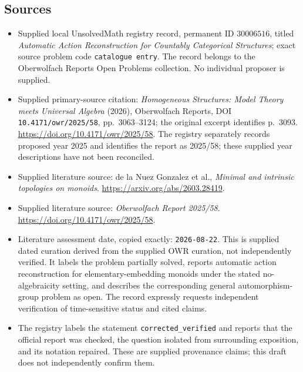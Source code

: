 \documentclass[11pt]{article}
\begin{document}
\subsection{Sources}
\begin{itemize}
\item Supplied local UnsolvedMath registry record, permanent ID \(30006516\), titled \emph{Automatic Action Reconstruction for Countably Categorical Structures}; exact source problem code \texttt{catalogue entry}. The record belongs to the Oberwolfach Reports Open Problems collection. No individual proposer is supplied.
\item Supplied primary-source citation: \emph{Homogeneous Structures: Model Theory meets Universal Algebra} (2026), Oberwolfach Reports, DOI \texttt{10.4171/owr/2025/58}, pp.\ 3063--3124; the original excerpt identifies p.\ 3093. \url{https://doi.org/10.4171/owr/2025/58}. The registry separately records proposed year 2025 and identifies the report as 2025/58; these supplied year descriptions have not been reconciled.
\item Supplied literature source: de la Nuez Gonzalez et al., \emph{Minimal and intrinsic topologies on monoids}. \url{https://arxiv.org/abs/2603.28419}.
\item Supplied literature source: \emph{Oberwolfach Report 2025/58}. \url{https://doi.org/10.4171/owr/2025/58}.
\item Literature assessment date, copied exactly: \texttt{2026-08-22}. This is supplied dated curation derived from the supplied OWR curation, not independently verified. It labels the problem partially solved, reports automatic action reconstruction for elementary-embedding monoids under the stated no-algebraicity setting, and describes the corresponding general automorphism-group problem as open. The record expressly requests independent verification of time-sensitive status and cited claims.
\item The registry labels the statement \texttt{corrected\_verified} and reports that the official report was checked, the question isolated from surrounding exposition, and its notation repaired. These are supplied provenance claims; this draft does not independently confirm them.
\end{itemize}
\end{document}
